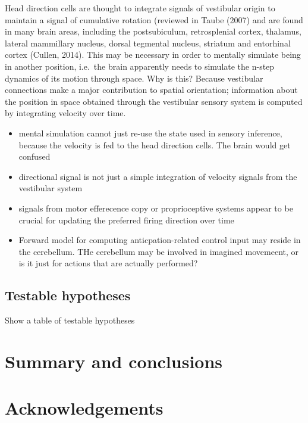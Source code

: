 \documentclass[english,floatsintext,man]{apa6}
\theoremstyle{definition}
\theoremstyle{definition}
\theoremstyle{remark}
\begin{document}
Head direction cells are thought to integrate signals of vestibular
origin to maintain a signal of cumulative rotation (reviewed in Taube
(2007) and are found in many brain areas, including the postsubiculum,
retrosplenial cortex, thalamus, lateral mammillary nucleus, dorsal
tegmental nucleus, striatum and entorhinal cortex (Cullen, 2014). This
may be necessary in order to mentally simulate being in another
position, i.e.~the brain apparently needs to simulate the n-step
dynamics of its motion through space. Why is this? Because vestibular
connections make a major contribution to spatial orientation;
information about the position in space obtained through the vestibular
sensory system is computed by integrating velocity over time.

\begin{itemize}
\item
  mental simulation cannot just re-use the state used in sensory
  inference, because the velocity is fed to the head direction cells.
  The brain would get confused
\item
  directional signal is not just a simple integration of velocity
  signals from the vestibular system
\item
  signals from motor efferecence copy or proprioceptive systems appear
  to be crucial for updating the preferred firing direction over time
\item
  Forward model for computing anticpation-related control input may
  reside in the cerebellum. THe cerebellum may be involved in imagined
  movemeent, or is it just for actions that are actually performed?
\end{itemize}

\subsection{Testable hypotheses}\label{testable-hypotheses}

Show a table of testable hypotheses

\section{Summary and conclusions}\label{summary-and-conclusions}

\section{Acknowledgements}\label{acknowledgements}

\newpage
\end{document}
